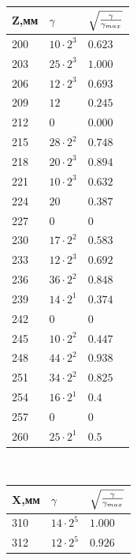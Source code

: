 \documentclass[a4paper, titlepage, 10pt]{article}
\begin{document}
\begin{minipage}{0.4\textwidth}
\begin{center}
 \begin{tabular}{|l|l|l|}
  \hline
  Z,мм & \( \gamma \) & \( \sqrt{\gamma \over  \gamma_{max}} \) \\
  \hline
  200 & \( 10 \cdot 2^3 \) & \( 0.623 \) \\
  \hline
  203 & \( 25 \cdot 2^3 \) & \( 1.000 \) \\
  \hline
  206 & \( 12 \cdot 2^3 \) & \( 0.693 \) \\
  \hline
  209 & \( 12 \) & \( 0.245 \) \\
  \hline
  212 & \( 0 \) & \( 0.000 \) \\
  \hline
  215 & \( 28 \cdot 2^2 \) & \( 0.748 \) \\
  \hline
  218 & \( 20 \cdot 2^3 \) & \( 0.894 \) \\
  \hline
  221 & \( 10 \cdot 2^3 \) & \( 0.632 \) \\
  \hline
  224 & \( 20 \) & \( 0.387 \) \\
  \hline
  227 & \( 0 \) & \( 0 \) \\
  \hline
  230 & \( 17 \cdot 2^2 \) & \( 0.583 \) \\
  \hline
  233 & \( 12 \cdot 2^3 \) & \( 0.692 \) \\
  \hline
  236 & \( 36 \cdot 2^2 \) & \( 0.848 \) \\
  \hline
  239 & \( 14 \cdot 2^1 \) & \( 0.374 \) \\
  \hline
  242 & \( 0 \) & \( 0 \) \\
  \hline
  245 & \( 10 \cdot 2^2 \) & \( 0.447 \) \\
  \hline
  248 & \( 44 \cdot 2^2 \) & \( 0.938 \) \\
  \hline
  251 & \( 34 \cdot 2^2 \) & \( 0.825 \) \\
  \hline
  254 & \( 16 \cdot 2^1 \) & \( 0.4 \) \\
  \hline
  257 & \( 0 \) & \( 0 \) \\
  \hline
  260 & \( 25 \cdot 2^1 \) & \( 0.5 \) \\
  \hline
 \end{tabular}
\\[1cm]
 \begin{tabular}{|l|l|l|}
  \hline
  X,мм & \( \gamma \) & \( \sqrt{\gamma \over  \gamma_{max}} \) \\
  \hline
  310 & \( 14 \cdot 2^5 \) & \( 1.000 \) \\
  \hline
  312 & \( 12 \cdot 2^5 \) & \( 0.926 \) \\

\end{tabular}
\end{center}
\end{minipage}
\end{document}
